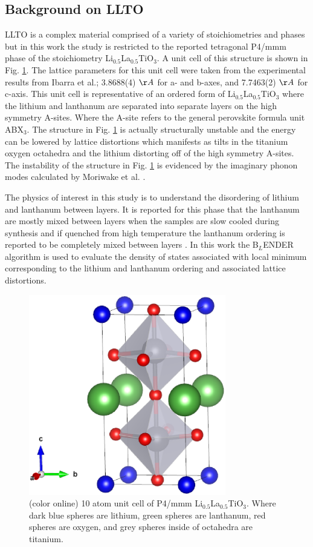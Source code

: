 \documentclass[aps,pre,reprint,superscriptaddress,showkeys]{revtex4-2}
\begin{document}
\subsection{Background on LLTO}
LLTO is a complex material comprised of a variety of stoichiometries and phases but in this work the study is restricted to the reported tetragonal P4/mmm phase of the stoichiometry Li$_{0.5}$La$_{0.5}$TiO$_{3}$\cite{LLTOreview,P4mmmstrucuture}. A unit cell of this structure is shown in Fig. \ref{LLTO_unit_cell}. The lattice parameters for this unit cell were taken from the experimental results from Ibarra et al.\cite{P4mmmstrucuture}; 3.8688(4) $\AA$ for a- and b-axes, and 7.7463(2) $\AA$ for c-axis.  This unit cell is representative of an ordered form of Li$_{0.5}$La$_{0.5}$TiO$_{3}$ where the lithium and lanthanum are separated into separate layers on the high symmetry A-sites. Where the A-site refers to the general perovskite formula unit ABX$_3$.  The structure in Fig. \ref{LLTO_unit_cell} is actually structurally unstable and the energy can be lowered by lattice distortions which manifests as tilts in the titanium oxygen octahedra and the lithium  distorting off of the high symmetry A-sites. The instability of the structure in Fig. \ref{LLTO_unit_cell} is evidenced by the imaginary phonon modes calculated by Moriwake et al. \cite{imaginaryphonons}.  

The physics of interest in this study is to understand the disordering of lithium and lanthanum between layers.  It is reported for this phase that the lanthanum are mostly mixed between layers when the samples are slow cooled during synthesis and if quenched from high temperature the lanthanum ordering is reported to be completely mixed between layers \cite{P4mmmstrucuture}. In this work the B$_L$ENDER algorithm is used to evaluate the density of states associated with local minimum corresponding to  the lithium and lanthanum ordering and associated lattice distortions.   
\begin{figure}[h!]
\includegraphics[width=8.6cm]{fig6.eps}
\caption{(color online) 10 atom unit cell of P4/mmm Li$_{0.5}$La$_{0.5}$TiO$_{3}$. Where dark blue spheres are lithium, green spheres are lanthanum, red spheres are oxygen, and grey spheres inside of octahedra are titanium.\label{LLTO_unit_cell}}
\end{figure}
\end{document}
